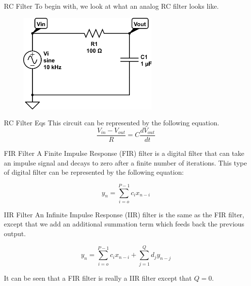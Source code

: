 \documentclass{beamer}
\begin{document}
\begin{frame}
\begin{block}{RC Filter}
To begin with, we look at what an analog RC filter looks like. 

{\begin{figure}[h!tb] 
\centering
\includegraphics[width=7cm]{../Images/rc-circuit.png}
\label{rc_circuit}
\end{figure}
}
\end{block}
\end{frame}

\begin{frame}
\begin{block}{RC Filter Eqs}
This circuit can be represented by the following equation.
\begin{equation}\label{eq:rc_circuit_eq}
\frac{V_{in}-V_{out}}{R}=C\frac{dV_{out}}{dt}
\end{equation}
\end{block}
\end{frame}

\begin{frame}
\begin{block}{FIR Filter}
A Finite Impulse Response (FIR) filter is a digital filter that can take an impulse signal and decays to zero after a finite number of iterations.  This type of digital filter can be represented by the following equation:

\begin{equation}
y_n=\displaystyle\sum\limits_{i=o}^{P-1} c_ix_{n-i}
\end{equation}
\end{block}
\end{frame}

\begin{frame}
\begin{block}{IIR Filter}
An Infinite Impulse Response (IIR) filter is the same as the FIR filter, except that we add an additional summation term which feeds back the previous output.

\begin{equation}
y_n=\displaystyle\sum\limits_{i=o}^{P-1} c_ix_{n-i}+\displaystyle\sum\limits_{j=1}^{Q} d_jy_{n-j}
\end{equation}

It can be seen that a FIR filter is really a IIR filter except that $Q=0$.  
\end{block}
\end{frame}
\end{document}
